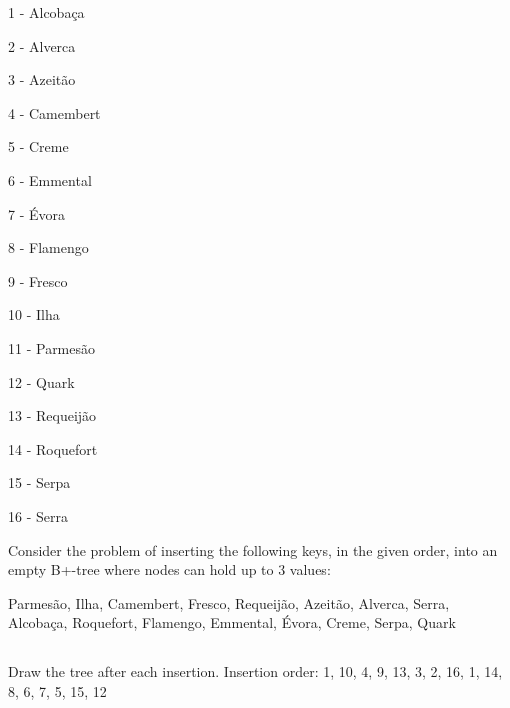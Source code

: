 1 - Alcobaça

2 - Alverca

3 - Azeitão

4 - Camembert

5 - Creme

6 - Emmental

7 - Évora

8 - Flamengo

9 - Fresco

10 - Ilha

11 - Parmesão

12 - Quark

13 - Requeijão

14 - Roquefort

15 - Serpa

16 - Serra

	{\color{gray}Consider the problem of inserting the following keys, in the given order, into an empty B+-tree where nodes can hold up to 3 values:}
	
	{\color{gray}Parmesão, Ilha, Camembert, Fresco, Requeijão, Azeitão, Alverca, Serra, Alcobaça, Roquefort, Flamengo, Emmental, Évora, Creme, Serpa, Quark}

	\subsection{}
	{\color{gray}Draw the tree after each insertion.}
 		Insertion order: 1, 10, 4, 9, 13, 3, 2, 16, 1, 14, 8, 6, 7, 5, 15, 12

\begin{center}
\end{center}


\begin{center}
\end{center}


